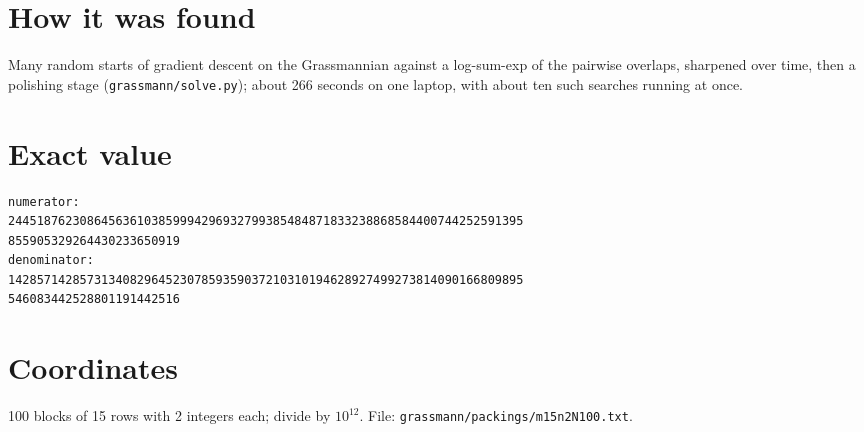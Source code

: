 \documentclass[11pt,a4paper]{article}
\begin{document}
\section{How it was found}
Many random starts of gradient descent on the Grassmannian against a log-sum-exp of the pairwise overlaps, sharpened over time, then a polishing stage (\texttt{grassmann/solve.py}); about 266 seconds on one laptop, with about ten such searches running at once.


\appendix
\section{Exact value}
{\small
\begin{verbatim}
numerator:
244518762308645636103859994296932799385484871833238868584400744252591395
855905329264430233650919
denominator:
142857142857313408296452307859359037210310194628927499273814090166809895
546083442528801191442516
\end{verbatim}}

\section{Coordinates}
100 blocks of 15 rows with 2 integers each; divide by $10^{12}$. File: \texttt{grassmann/packings/m15n2N100.txt}.
{\tiny
\begin{multicols}{4}
\end{multicols}}
\end{document}
